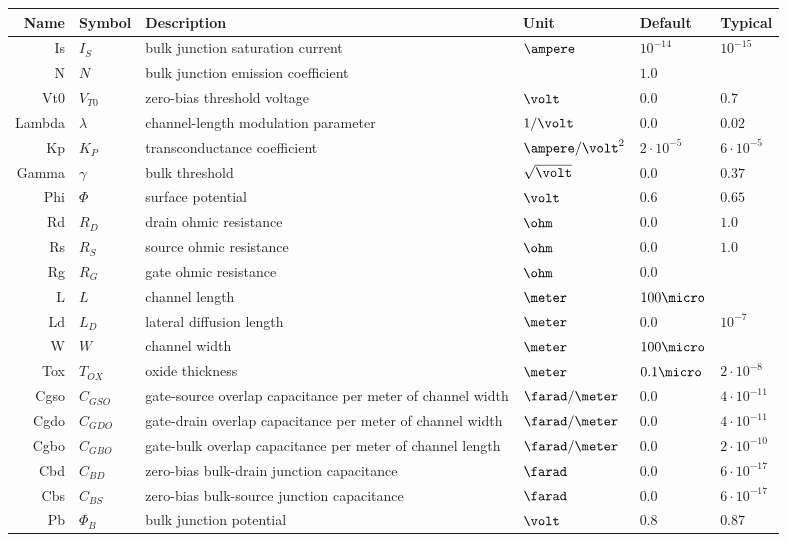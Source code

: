 \begin{longtable}{rlllll}
Name & Symbol & Description & Unit & Default & Typical\\
\hline
\endhead
Is & $I_{S}$ & bulk junction saturation current & $\ampere$ & $10^{-14}$ & $10^{-15}$\\
N & $N$ & bulk junction emission coefficient &  & $1.0$ & \\
Vt0 & $V_{T0}$ & zero-bias threshold voltage & $\volt$ & $0.0$ & $0.7$\\
Lambda & $\lambda$ & channel-length modulation parameter & $1/\volt$ & $0.0$ & $0.02$\\
Kp & $K_P$ & transconductance coefficient & $\ampere/\volt^2$ & $2\cdot 10^{-5}$ & $6\cdot 10^{-5}$\\
Gamma & $\gamma$ & bulk threshold & $\sqrt{\volt}$ & $0.0$ & $0.37$\\
Phi & $\Phi$ & surface potential & $\volt$ & $0.6$ & $0.65$\\
Rd & $R_D$ & drain ohmic resistance & $\ohm$ & $0.0$ & $1.0$\\
Rs & $R_S$ & source ohmic resistance & $\ohm$ & $0.0$ & $1.0$\\
Rg & $R_G$ & gate ohmic resistance & $\ohm$ & $0.0$ & \\
L & $L$ & channel length & $\meter$ & $100\micro$ & \\
Ld & $L_D$ & lateral diffusion length & $\meter$ & $0.0$ & $10^{-7}$\\
W & $W$ & channel width & $\meter$ & $100\micro$ & \\
Tox & $T_{OX}$ & oxide thickness & $\meter$ & $0.1\micro$ & $2\cdot 10^{-8}$\\
Cgso & $C_{GSO}$ & \parbox[t]{6.0cm}{gate-source overlap capacitance per meter of channel width} & $\farad/\meter$ & $0.0$ & $4\cdot 10^{-11}$\\
Cgdo & $C_{GDO}$ & \parbox[t]{6.0cm}{gate-drain overlap capacitance per meter of channel width} & $\farad/\meter$ & $0.0$ & $4\cdot 10^{-11}$\\
Cgbo & $C_{GBO}$ & \parbox[t]{6.0cm}{gate-bulk overlap capacitance per meter of channel length} & $\farad/\meter$ & $0.0$ & $2\cdot 10^{-10}$\\
Cbd & $C_{BD}$ & \parbox[t]{6.0cm}{zero-bias bulk-drain junction capacitance} & $\farad$ & $0.0$ & $6\cdot 10^{-17}$\\
Cbs & $C_{BS}$ & \parbox[t]{6.0cm}{zero-bias bulk-source junction capacitance} & $\farad$ & $0.0$ & $6\cdot 10^{-17}$\\
Pb & $\Phi_{B}$ & bulk junction potential & $\volt$ & $0.8$ & $0.87$\\

\end{longtable}
